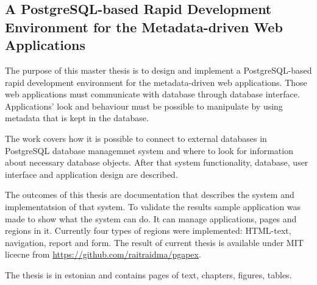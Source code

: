 \documentclass[a4paper,12pt]{article} %
\begin{document}
\subsection*{A PostgreSQL-based Rapid Development Environment for the Metadata-driven Web Applications}
The purpose of this master thesis is to design and implement a PostgreSQL-based rapid development environment for the metadata-driven web applications. Those web applications must communicate with database through database interface. Applications' look and behaviour must be possible to manipulate by using metadata that is kept in the database.\par
The work covers how it is possible to connect to external databases in PostgreSQL database managemnet system and where to look for information about necessary database objects. After that system functionality, database, user interface and application design are described.\par
The outcomes of this thesis are documentation that describes the system and implementatsion of that system. To validate the results sample application was made to show what the system can do. It can manage applications, pages and regions in it. Currently four types of regions were implemented: HTML-text, navigation, report and form.
The result of current thesis is available under MIT licecne from \url{https://github.com/raitraidma/pgapex}.
\par
The thesis is in estonian and contains \totalpages{} pages of text, \totalsections{} chapters, \totalfigures{} figures, \totaltables{} tables.
\pagebreak
\end{document}
